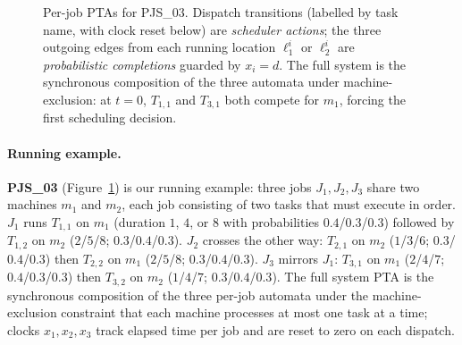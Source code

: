 \begin{figure}[ht]
{
  }%
  \caption{%
    Per-job PTAs for PJS\_03.  Dispatch transitions (labelled by task name,
    with clock reset below) are \emph{scheduler actions}; the three outgoing
    edges from each running location $\ell^i_1$ or $\ell^i_2$ are
    \emph{probabilistic completions} guarded by $x_i{=}d$.
    The full system is the synchronous composition of the three automata under
    machine-exclusion: at $t{=}0$, $T_{1,1}$ and $T_{3,1}$ both compete for
    $m_1$, forcing the first scheduling decision.%
  }
  \label{fig:pjs03_pta}
\end{figure}


\paragraph{Running example.}
\textbf{PJS\_03} (Figure~\ref{fig:pjs03_pta}) is our running example: three
jobs $J_1, J_2, J_3$ share two machines $m_1$ and $m_2$, each job consisting
of two tasks that must execute in order.  $J_1$ runs $T_{1,1}$ on $m_1$
(duration $1$, $4$, or $8$ with probabilities $0.4$/$0.3$/$0.3$) followed by
$T_{1,2}$ on $m_2$ ($2$/$5$/$8$; $0.3$/$0.4$/$0.3$).  $J_2$ crosses the
other way: $T_{2,1}$ on $m_2$ ($1$/$3$/$6$; $0.3$/$0.4$/$0.3$) then
$T_{2,2}$ on $m_1$ ($2$/$5$/$8$; $0.3$/$0.4$/$0.3$).  $J_3$ mirrors $J_1$:
$T_{3,1}$ on $m_1$ ($2$/$4$/$7$; $0.4$/$0.3$/$0.3$) then $T_{3,2}$ on $m_2$
($1$/$4$/$7$; $0.3$/$0.4$/$0.3$).  The full system PTA is the synchronous
composition of the three per-job automata under the machine-exclusion
constraint that each machine processes at most one task at a time; clocks
$x_1, x_2, x_3$ track elapsed time per job and are reset to zero on each
dispatch.

